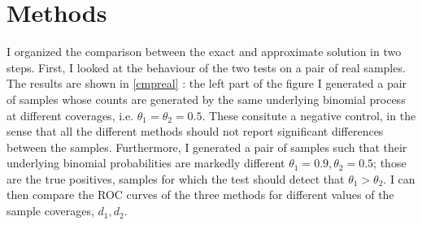 \documentclass[11pt]{amsart}
\begin{document}
\section{Methods}
I organized the comparison between the exact and approximate solution in two steps. First,
I looked at the behaviour of the two tests on a pair of real samples. The results are shown in \ref{cmpreal} : the left part of the figure  I generated a pair of samples whose counts are generated by the same underlying binomial process at different coverages, i.e. $\theta_1=\theta_2=0.5$. These consitute a negative control, in the sense that all the different methods should not report significant differences between the samples. Furthermore, I generated a pair of samples such that their underlying binomial probabilities are markedly different $\theta_1=0.9,\theta_2=0.5$; those are the true positives, samples for which the test should detect that $\theta_1>\theta_2$. I can then compare the ROC curves of the three methods for different values of the sample coverages, $d_1,d_2$. 
\end{document}
